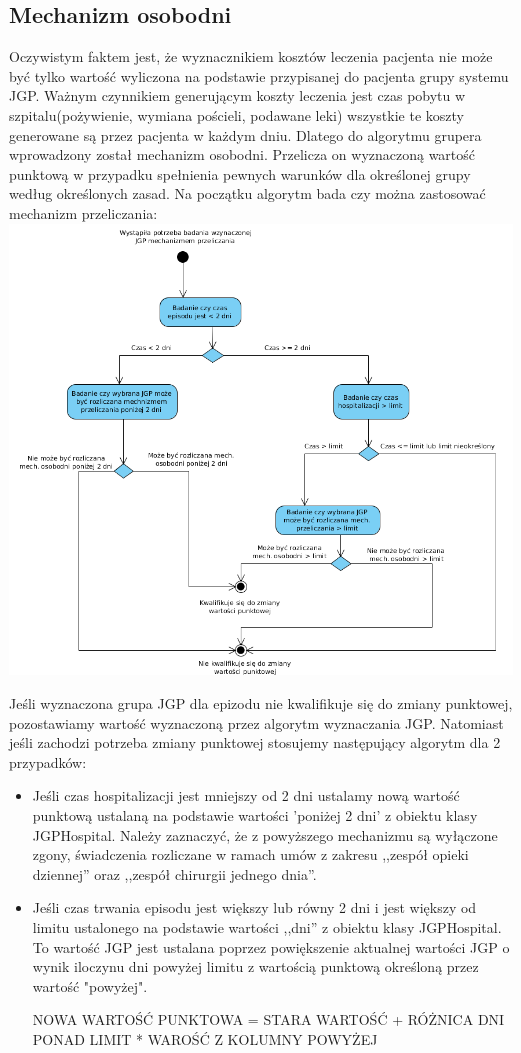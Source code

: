 \subsection{Mechanizm osobodni}
\label{sec:mechanizmOsobodni}
Oczywistym faktem jest, że wyznacznikiem kosztów leczenia pacjenta nie może być tylko wartość wyliczona na podstawie przypisanej do pacjenta grupy systemu JGP. Ważnym czynnikiem generującym koszty leczenia jest czas pobytu w szpitalu(pożywienie, wymiana pościeli, podawane leki) wszystkie te koszty generowane są przez pacjenta w każdym dniu. Dlatego do algorytmu grupera wprowadzony został mechanizm osobodni. Przelicza on wyznaczoną wartość punktową w przypadku spełnienia pewnych warunków dla określonej grupy według określonych zasad. Na początku algorytm bada czy można zastosować mechanizm przeliczania:
\includegraphics[scale=0.5]{images/activity-manday}

Jeśli wyznaczona grupa JGP dla epizodu nie kwalifikuje się do zmiany punktowej, pozostawiamy wartość wyznaczoną przez algorytm wyznaczania JGP. Natomiast jeśli zachodzi potrzeba zmiany punktowej stosujemy następujący algorytm dla 2 przypadków:
\begin{itemize}
\item Jeśli czas hospitalizacji jest mniejszy od 2 dni ustalamy nową wartość punktową ustalaną na podstawie wartości 'poniżej 2 dni' z obiektu klasy JGPHospital. Należy zaznaczyć, że z powyższego mechanizmu są wyłączone zgony, świadczenia rozliczane w ramach umów z zakresu ,,zespół opieki dziennej'' oraz ,,zespół chirurgii jednego dnia''.
\item Jeśli czas trwania episodu jest większy lub równy 2 dni i jest większy od limitu ustalonego na podstawie wartości ,,dni'' z obiektu klasy JGPHospital. To wartość JGP jest ustalana poprzez powiększenie aktualnej wartości JGP o wynik iloczynu dni powyżej limitu z wartością punktową określoną przez wartość "powyżej".

NOWA WARTOŚĆ PUNKTOWA = STARA WARTOŚĆ + RÓŻNICA DNI PONAD LIMIT * WAROŚĆ Z KOLUMNY POWYŻEJ
\end{itemize} 

